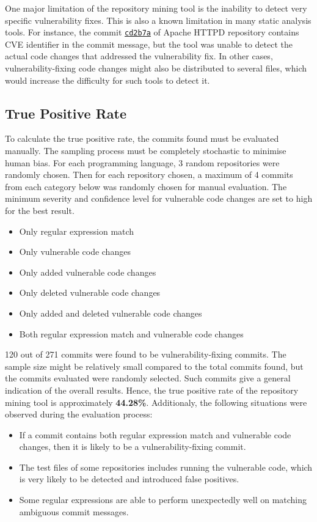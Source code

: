 \documentclass[12pt, a4paper]{report}
\begin{document}
One major limitation of the repository mining tool is the inability to detect very specific
vulnerability fixes. This is also a known limitation in many static analysis tools. For instance,
the commit \href{https://github.com/apache/httpd/commit/cd2b7a}{\color{blue}\texttt{cd2b7a}} of
Apache HTTPD repository contains CVE identifier in the commit message, but the tool was unable to
detect the actual code changes that addressed the vulnerability fix. In other cases,
vulnerability-fixing code changes might also be distributed to several files, which would increase
the difficulty for such tools to detect it.

\subsection{True Positive Rate}
To calculate the true positive rate, the commits found must be evaluated manually. The sampling
process must be completely stochastic to minimise human bias. For each programming language, 3
random repositories were randomly chosen. Then for each repository chosen, a maximum of 4 commits
from each category below was randomly chosen for manual evaluation. The minimum severity and
confidence level for vulnerable code changes are set to high for the best result.
\begin{itemize}
  \item Only regular expression match
  \item Only vulnerable code changes
  \item Only added vulnerable code changes
  \item Only deleted vulnerable code changes
  \item Only added and deleted vulnerable code changes
  \item Both regular expression match and vulnerable code changes
\end{itemize}
120 out of 271 commits were found to be vulnerability-fixing commits. The sample size might be
relatively small compared to the total commits found, but the commits evaluated were randomly
selected. Such commits give a general indication of the overall results. Hence, the true positive
rate of the repository mining tool is approximately \textbf{44.28\%}. Additionaly, the following
situations were observed during the evaluation process:
\begin{itemize}
  \item If a commit contains both regular expression match and vulnerable code changes, then it is
  likely to be a vulnerability-fixing commit.
  \item The test files of some repositories includes running the vulnerable code, which is very
  likely to be detected and introduced false positives.
  \item Some regular expressions are able to perform unexpectedly well on matching ambiguous commit
  messages.
\end{itemize}
\end{document}
